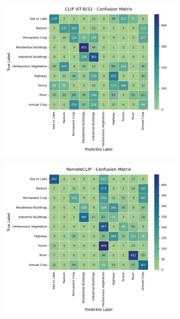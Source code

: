 \documentclass[a4paper, oneside, english]{sapthesis} %
\begin{document}
\begin{figure}[h]
  \begin{subfigure}[t]{.5\textwidth}
    \centering
    \includegraphics[width=\linewidth]{img/EuroSAT_CLIP_32_cm.png}
  \end{subfigure}
  \hfill
  \begin{subfigure}[t]{.5\textwidth}
    \centering
    \includegraphics[width=\linewidth]{img/EuroSAT_RemoteCLIP_32_cm.png}
  \end{subfigure}


\end{figure}
\end{document}
